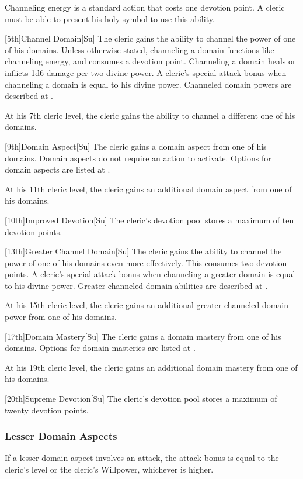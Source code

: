 Channeling energy is a standard action that costs one devotion point.
A cleric must be able to present his holy symbol to use this ability.

[5th]{Channel Domain}[Su]
The cleric gains the ability to channel the power of one of his domains.
Unless otherwise stated, channeling a domain functions like channeling energy, and consumes a devotion point.
Channeling a domain heals or inflicts 1d6 damage per two divine power.
A cleric's special attack bonus when channeling a domain is equal to his divine power.
Channeled domain powers are described at .

At his 7th cleric level, the cleric gains the ability to channel a different one of his domains.

[9th]{Domain Aspect}[Su]
The cleric gains a domain aspect from one of his domains.
Domain aspects do not require an action to activate.
Options for domain aspects are listed at .

At his 11th cleric level, the cleric gains an additional domain aspect from one of his domains.

[10th]{Improved Devotion}[Su]
The cleric's devotion pool stores a maximum of ten devotion points.

[13th]{Greater Channel Domain}[Su]
The cleric gains the ability to channel the power of one of his domains even more effectively.
This consumes two devotion points.
A cleric's special attack bonus when channeling a greater domain is equal to his divine power.
Greater channeled domain abilities are described at .

At his 15th cleric level, the cleric gains an additional greater channeled domain power from one of his domains.

[17th]{Domain Mastery}[Su]
The cleric gains a domain mastery from one of his domains.
Options for domain masteries are listed at .

At his 19th cleric level, the cleric gains an additional domain mastery from one of his domains.

[20th]{Supreme Devotion}[Su]
The cleric's devotion pool stores a maximum of twenty devotion points.


\subsubsection{Lesser Domain Aspects}\label{Lesser Domain Aspects}
If a lesser domain aspect involves an attack, the attack bonus is equal to the cleric's level or the cleric's Willpower, whichever is higher.

